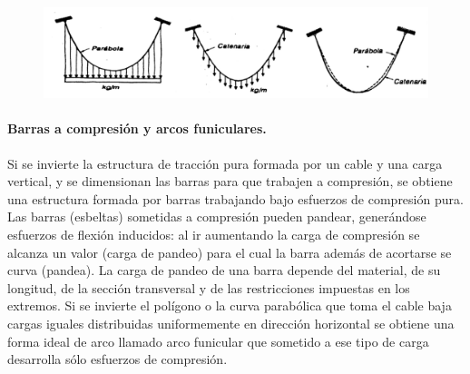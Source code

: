\begin{figure}[h]
    \centering
    \includegraphics[width=\linewidth]{Imagenes/Catenaria y parabola.png}
\end{figure}

\paragraph{Barras a compresión y arcos funiculares.}
Si se invierte la estructura de tracción pura formada por un cable y una carga vertical, y se dimensionan las barras para que trabajen a compresión, se obtiene una estructura formada por barras trabajando bajo esfuerzos de compresión pura. Las barras (esbeltas) sometidas a compresión pueden pandear, generándose esfuerzos de flexión inducidos: al ir aumentando la carga de compresión se alcanza un valor (carga de pandeo) para el cual la barra además de acortarse se curva (pandea). La carga de pandeo de una barra depende del material, de su longitud, de la sección transversal y de las restricciones impuestas en los extremos. Si se invierte el polígono o la curva parabólica que toma el cable baja cargas iguales distribuidas uniformemente en dirección horizontal se obtiene una forma ideal de arco llamado arco funicular que sometido a ese tipo de carga desarrolla sólo esfuerzos de compresión.

